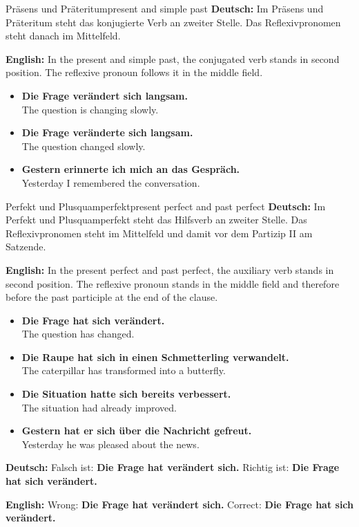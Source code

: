 \documentclass[a4paper,11pt]{article}
\newcommand{\GermanText}[1]{\textbf{Deutsch: }#1\par}
\newcommand{\EnglishText}[1]{{\small\color{SoftGray}\textbf{English: }#1\par}}
\newcommand{\ExampleItem}[2]{\item \textbf{#1}\\{\small\color{SoftGray}#2}}
\begin{document}
        \begin{grammarentry}{Präsens und Präteritum}{present and simple past}
            \GermanText{Im Präsens und Präteritum steht das konjugierte Verb an zweiter Stelle. Das Reflexivpronomen steht danach im Mittelfeld.}
            \EnglishText{In the present and simple past, the conjugated verb stands in second position. The reflexive pronoun follows it in the middle field.}

            \begin{exbox}
                \begin{itemize}
                    \ExampleItem{Die Frage verändert sich langsam.}{The question is changing slowly.}
                    \ExampleItem{Die Frage veränderte sich langsam.}{The question changed slowly.}
                    \ExampleItem{Gestern erinnerte ich mich an das Gespräch.}{Yesterday I remembered the conversation.}
                \end{itemize}
            \end{exbox}
        \end{grammarentry}

        \begin{grammarentry}{Perfekt und Plusquamperfekt}{present perfect and past perfect}
            \GermanText{Im Perfekt und Plusquamperfekt steht das Hilfsverb an zweiter Stelle. Das Reflexivpronomen steht im Mittelfeld und damit vor dem Partizip II am Satzende.}
            \EnglishText{In the present perfect and past perfect, the auxiliary verb stands in second position. The reflexive pronoun stands in the middle field and therefore before the past participle at the end of the clause.}

            \begin{exbox}
                \begin{itemize}
                    \ExampleItem{Die Frage hat sich verändert.}{The question has changed.}
                    \ExampleItem{Die Raupe hat sich in einen Schmetterling verwandelt.}{The caterpillar has transformed into a butterfly.}
                    \ExampleItem{Die Situation hatte sich bereits verbessert.}{The situation had already improved.}
                    \ExampleItem{Gestern hat er sich über die Nachricht gefreut.}{Yesterday he was pleased about the news.}
                \end{itemize}
            \end{exbox}

            \GermanText{Falsch ist: \textbf{Die Frage hat verändert sich.} Richtig ist: \textbf{Die Frage hat sich verändert.}}
            \EnglishText{Wrong: \textbf{Die Frage hat verändert sich.} Correct: \textbf{Die Frage hat sich verändert.}}
        \end{grammarentry}
\end{document}
